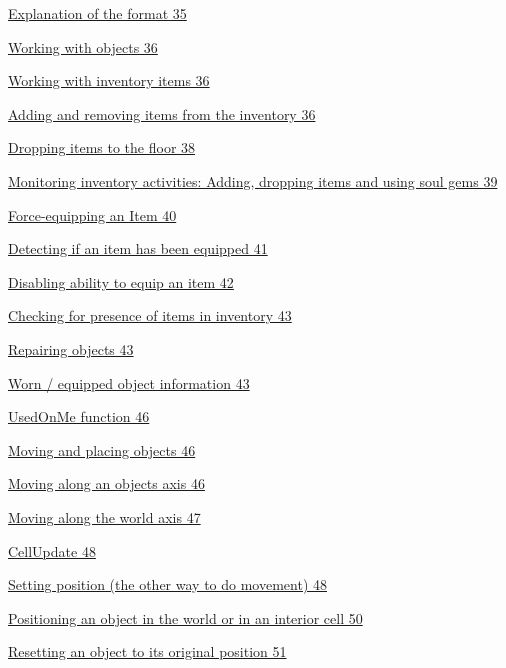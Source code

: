 \documentclass[
]{article}
\begin{document}
\protect\hyperlink{explanation-of-the-format}{Explanation of the format
35}

\protect\hyperlink{working-with-objects}{Working with objects 36}

\protect\hyperlink{working-with-inventory-items}{Working with inventory
items 36}

\protect\hyperlink{adding-and-removing-items-from-the-inventory}{Adding
and removing items from the inventory 36}

\protect\hyperlink{dropping-items-to-the-floor}{Dropping items to the
floor 38}

\protect\hyperlink{monitoring-inventory-activities-adding-dropping-items-and-using-soul-gems}{Monitoring
inventory activities: Adding, dropping items and using soul gems 39}

\protect\hyperlink{force-equipping-an-item}{Force-equipping an Item 40}

\protect\hyperlink{detecting-if-an-item-has-been-equipped}{Detecting if
an item has been equipped 41}

\protect\hyperlink{disabling-ability-to-equip-an-item}{Disabling ability
to equip an item 42}

\protect\hyperlink{_Toc182634518}{Checking for presence of items in
inventory 43}

\protect\hyperlink{repairing-objects}{Repairing objects 43}

\protect\hyperlink{worn-equipped-object-information}{Worn / equipped
object information 43}

\protect\hyperlink{usedonme-function}{UsedOnMe function 46}

\protect\hyperlink{moving-and-placing-objects}{Moving and placing
objects 46}

\protect\hyperlink{moving-along-an-objects-axis}{Moving along an objects
axis 46}

\protect\hyperlink{moving-along-the-world-axis}{Moving along the world
axis 47}

\protect\hyperlink{cellupdate}{CellUpdate 48}

\protect\hyperlink{setting-position-the-other-way-to-do-movement}{Setting
position (the other way to do movement) 48}

\protect\hyperlink{positioning-an-object-in-the-world-or-in-an-interior-cell}{Positioning
an object in the world or in an interior cell 50}

\protect\hyperlink{resetting-an-object-to-its-original-position}{Resetting
an object to its original position 51}
\end{document}
